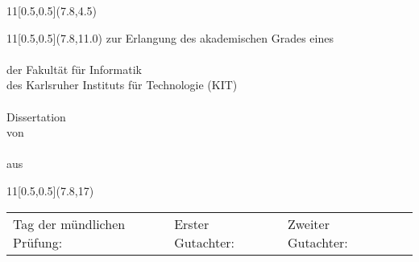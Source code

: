 \begin{titlepage}
\thispagestyle{empty}

%
\mbox{}%
 	\begin{textblock}{11}[0.5,0.5](7.8,4.5)
		\sffamily%
		\LARGE%
 		\centering%
		\textbf{\WorktitleDivided}
 	\end{textblock}

 	\begin{textblock}{11}[0.5,0.5](7.8,11.0)
 		\sffamily%
		\centering%
		zur Erlangung des akademischen Grades eines\\%
		\vspace{0.5\baselineskip}%
		\Large%
		\DocDegree%
		\vspace{1\baselineskip}\\%
		\normalsize%
		der Fakultät für Informatik\texorpdfstring{\\}{}%
		des Karlsruher Instituts für Technologie (KIT)%
		\vspace{0.75\baselineskip}\\%
%
		\vspace{0.5\baselineskip}\\%
		\Large%
		{Dissertation}%
		\vspace{0.5\baselineskip}\\%
		\normalsize%
		von%
		\vspace{0.5\baselineskip}\\%
		\Large%
		\textbf{\Authorname}%
		\vspace{0.5\baselineskip}\\%
		\normalsize%
		aus \PlaceOfBirth%
 	\end{textblock}

	\begin{textblock}{11}[0.5,0.5](7.8,17)
	\sffamily%
	\raggedleft%
		\begin{tabular}{lp{0.5cm}l}
			Tag der mündlichen Prüfung: && \ExamDate\texorpdfstring{\\}{}
			Erster Gutachter: && \Reviewer\texorpdfstring{\\}{}
			Zweiter Gutachter: && \Supervisor\texorpdfstring{\\}{}
		\end{tabular}
 	\end{textblock}
	
\end{titlepage}